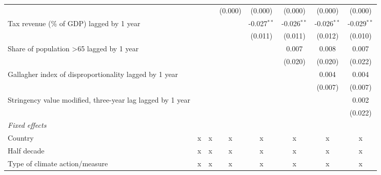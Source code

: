 \begin{tabular}{lccccccc}
                                                                                         &         &         & (0.000)       & (0.000)       & (0.000)       & (0.000)       & (0.000)\\   
   Tax revenue (\% of GDP) lagged by 1 year                                              &         &         &               & -0.027$^{**}$ & -0.026$^{**}$ & -0.026$^{**}$ & -0.029$^{**}$\\   
                                                                                         &         &         &               & (0.011)       & (0.011)       & (0.012)       & (0.010)\\   
   Share of population >65 lagged by 1 year                                              &         &         &               &               & 0.007         & 0.008         & 0.007\\   
                                                                                         &         &         &               &               & (0.020)       & (0.020)       & (0.022)\\   
   Gallagher index of disproportionality lagged by 1 year                                &         &         &               &               &               & 0.004         & 0.004\\   
                                                                                         &         &         &               &               &               & (0.007)       & (0.007)\\   
   Stringency value modified, three-year lag lagged by 1 year                            &         &         &               &               &               &               & 0.002\\   
                                                                                         &         &         &               &               &               &               & (0.022)\\   
   \emph{Fixed effects}\\
   Country                                                                               & x       & x       & x             & x             & x             & x             & x\\  
   Half decade                                                                           & x       & x       & x             & x             & x             & x             & x\\  
   Type of climate action/measure                                                        & x       & x       & x             & x             & x             & x             & x\\  

\end{tabular}

